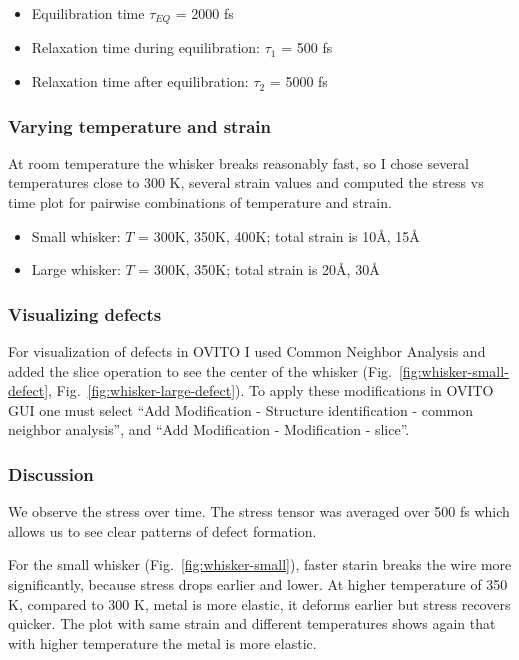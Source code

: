 \documentclass[12pt,a4paper]{article}
\begin{document}
\begin{itemize}
	\item Equilibration time $\tau_{EQ}$ = 2000 fs
	\item Relaxation time during equilibration: $\tau_1$ = 500 fs
	\item Relaxation time after equilibration: $\tau_2$ = 5000 fs
\end{itemize}

\subsubsection*{Varying temperature and strain}

At room temperature the whisker breaks reasonably fast, so I chose several temperatures close to 300 K, several strain values and computed the stress vs time plot for pairwise combinations of temperature and strain.

\begin{itemize}
	\item Small whisker: $T$ = 300K, 350K, 400K; total strain is 10Å, 15Å
	\item Large whisker: $T$ = 300K, 350K; total strain is 20Å, 30Å
\end{itemize}

\subsubsection*{Visualizing defects}

For visualization of defects in OVITO I used Common Neighbor Analysis and added the slice operation to see the center of the whisker (Fig.~\ref{fig:whisker-small-defect}, Fig.~\ref{fig:whisker-large-defect}). To apply these modifications in OVITO GUI one must select ``Add Modification - Structure identification - common neighbor analysis'', and ``Add Modification - Modification - slice''.


\subsubsection*{Discussion}

We observe the stress over time. The stress tensor was averaged over 500 fs which allows us to see clear patterns of defect formation.

For the small whisker (Fig.~\ref{fig:whisker-small}), faster starin breaks the wire more significantly, because stress drops earlier and lower. At higher temperature of 350 K, compared to 300 K, metal is more elastic, it deforms earlier but stress recovers quicker. The plot with same strain and different temperatures shows again that with higher temperature the metal is more elastic.
\end{document}
